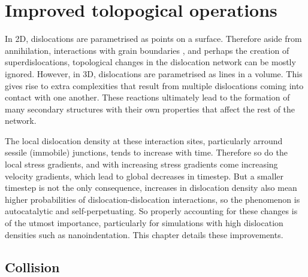 \chapter{Improved tolopogical operations}
\label{c:topology}

In 2D, dislocations are parametrised as points on a surface. Therefore aside from annihilation, interactions with grain boundaries \cite{grain_size_eff1, grain_size_eff2}, and perhaps the creation of superdislocations, topological changes in the dislocation network can be mostly ignored. However, in 3D, dislocations are parametrised as lines in a volume. This gives rise to extra complexities that result from multiple dislocations coming into contact with one another. These reactions ultimately lead to the formation of many secondary structures with their own properties that affect the rest of the network.

The local dislocation density at these interaction sites, particularly arround sessile (immobile) junctions, tends to increase with time. Therefore so do the local stress gradients, and with increasing stress gradients come increasing velocity gradients, which lead to global decreases in timestep. But a smaller timestep is not the only consequence, increases in dislocation density also mean higher probabilities of dislocation-dislocation interactions, so the phenomenon is autocatalytic and self-perpetuating. So properly accounting for these changes is of the utmost importance, particularly for simulations with high dislocation densities such as nanoindentation. This chapter details these improvements.

\section{Collision}\label{s:collision}

